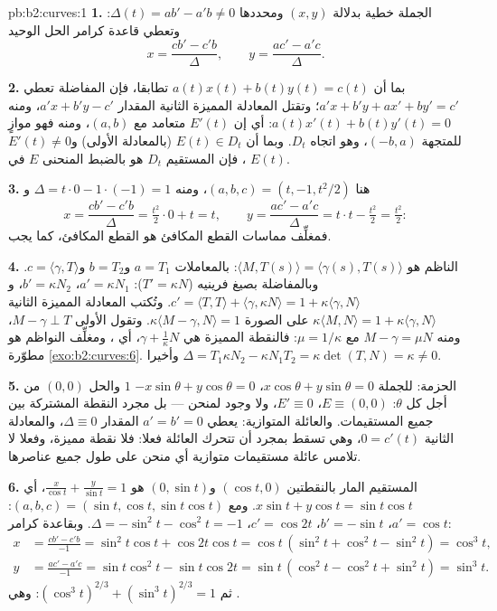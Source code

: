 \begin{solution}{pb:b2:curves:1}
\textbf{1.} الجملة خطية بدلالة $(x, y)$ ومحددها $\Delta(t) = a b' - a'b \neq 0$: وتعطي قاعدة
كرامر الحل الوحيد
\[
x = \frac{c b' - c' b}{\Delta}, \qquad
y = \frac{a c' - a' c}{\Delta}.
\]

\textbf{2.} بما أن $a(t)x(t) + b(t)y(t) = c(t)$ تطابقا، فإن المفاضلة تعطي $a'x + b'y + ax' + by' = c'$؛
وتقتل المعادلة المميزة الثانية المقدار $a'x + b'y - c'$، ومنه $a(t)x'(t) + b(t)y'(t) = 0$: أي إن
$E'(t)$ متعامد مع $(a,
b)$، ومنه فهو موازٍ للمتجهة $(-b, a)$، وهو اتجاه
$D_t$. وبما أن $E(t) \in D_t$ (بالمعادلة الأولى) و$E'(t) \neq 0$، فإن المستقيم
$D_t$ هو بالضبط  المنحنى $E$ في $E(t)$.

\textbf{3.} هنا $(a, b, c) = (t, -1, t^2/2)$، ومنه $\Delta =
t\cdot0 - 1\cdot(-1) = 1$ و
\[
x = \frac{c b' - c' b}{\Delta} = \tfrac{t^2}2\cdot 0 +
t = t, \qquad
y = \frac{a c' - a' c}{\Delta} = t\cdot t - \tfrac{t^2}2 =
\tfrac{t^2}2 :
\]
فمغلِّف مماسات القطع المكافئ هو القطع المكافئ، كما يجب.

\textbf{4.} الناظم هو $\langle M, T(s)\rangle =
\langle\gamma(s), T(s)\rangle$: بالمعاملات $a = T_1$ و$b =
T_2$ و$c = \langle\gamma, T\rangle$.
وبالمفاضلة بصيغ فرينيه ($T' = \kappa N$): $a' = \kappa N_1$، $b' = \kappa
N_2$، و$c' = \langle T, T\rangle + \langle\gamma, \kappa
N\rangle = 1 + \kappa\langle\gamma, N\rangle$. وتُكتب
المعادلة المميزة الثانية $\kappa\langle M, N\rangle = 1 +
\kappa\langle\gamma, N\rangle$ على الصورة $\kappa\langle M -
\gamma, N\rangle = 1$. وتقول الأولى
$M - \gamma \perp T$، ومنه $M - \gamma = \mu N$ مع $\mu = 1/\kappa$: فالنقطة المميزة هي $\gamma + \frac1\kappa N$، أي
، ومغلِّف النواظم هو مطوّرة \cref{exo:b2:curves:6}. وأخيرا $\Delta = T_1\kappa N_2 -
\kappa N_1 T_2 = \kappa\det(T, N) = \kappa \neq 0$.

\textbf{5.} الحزمة: للجملة $x\cos\theta + y\sin\theta =
0$، $-x\sin\theta + y\cos\theta = 0$  $1$ والحل $(0,0)$
من أجل كل $\theta$: $E \equiv (0,0)$، $E'
\equiv 0$، ولا وجود لمنحن --- بل مجرد
النقطة المشتركة بين جميع المستقيمات. والعائلة المتوازية: يعطي $a' = b' = 0$
المقدار $\Delta \equiv 0$، والمعادلة الثانية $0 = c'(t)$، وهي تسقط بمجرد أن تتحرك
العائلة فعلا: فلا نقطة مميزة، وفعلا لا تلامس عائلة مستقيمات متوازية
أي منحن على طول جميع عناصرها.

\textbf{6.} المستقيم المار بالنقطتين $(\cos t, 0)$ و$(0, \sin t)$ هو $\frac x{\cos t} + \frac y{\sin t} = 1$، أي
$x\sin t +
y\cos t = \sin t\cos t$. ومع $(a, b, c) = (\sin t, \cos t,
\sin t\cos t)$: $a' = \cos t$، $b' = -\sin t$، $c' = \cos
2t$، $\Delta = -\sin^2 t - \cos^2 t = -1$. وبقاعدة
كرامر:
\begin{align*}
x &= \frac{cb' - c'b}{-1} = \sin^2 t\cos t + \cos 2t\cos t
= \cos t\,(\sin^2 t + \cos^2 t - \sin^2 t) = \cos^3 t,\\
y &= \frac{ac' - a'c}{-1} = \sin t\cos^2 t - \sin t\cos 2t
= \sin t\,(\cos^2 t - \cos^2 t + \sin^2 t) = \sin^3 t .
\end{align*}
ثم $(\cos^3t)^{2/3} + (\sin^3t)^{2/3} = 1$: وهي .


\end{solution}
